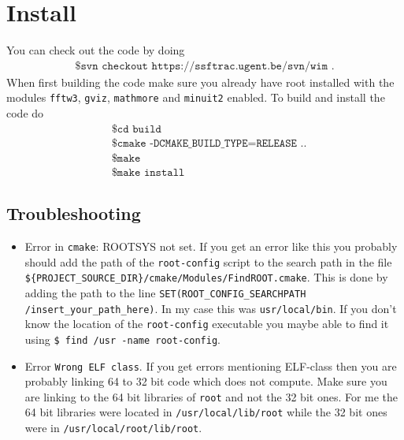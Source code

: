 \section{Install}
You can check out the code by doing
\begin{align*}
	\texttt{\$ svn checkout https://ssftrac.ugent.be/svn/wim .}
\end{align*}
When first building the code make sure you already have root installed with the modules \texttt{fftw3}, \texttt{gviz}, \texttt{mathmore} and \texttt{minuit2} enabled. To build and install the code do
\begin{align*}
    & \texttt{\$ cd build} \\
	& \texttt{\$ cmake -DCMAKE\_BUILD\_TYPE=RELEASE ..} \\
	& \texttt{\$ make } \\
	& \texttt{\$ make install } 
\end{align*}
\subsection{Troubleshooting}
\begin{itemize}
\item Error in \texttt{cmake}: ROOTSYS not set.
If you get an error like this you probably should add the path of the \texttt{root-config} script to the search path in the file \texttt{\$\{PROJECT\_SOURCE\_DIR\}/cmake/Modules/FindROOT.cmake}. This is done by adding the path to the line \texttt{SET(ROOT\_CONFIG\_SEARCHPATH /insert\_your\_path\_here)}. In my case this was \texttt{usr/local/bin}. If you don't know the location of the \texttt{root-config} executable you maybe able to find it using \texttt{\$ find /usr -name root-config}.
\item Error \texttt{Wrong ELF class}. If you get errors mentioning ELF-class then you are probably linking 64 to 32 bit code which does not compute. Make sure you are linking to the 64 bit libraries of \texttt{root} and not the 32 bit ones. For me the 64 bit libraries were located in \texttt{/usr/local/lib/root} while the 32 bit ones were in \texttt{/usr/local/root/lib/root}. 
\end{itemize}